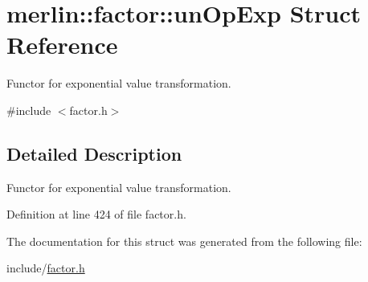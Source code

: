 \hypertarget{structmerlin_1_1factor_1_1unOpExp}{}\section{merlin\+:\+:factor\+:\+:un\+Op\+Exp Struct Reference}
\label{structmerlin_1_1factor_1_1unOpExp}


Functor for exponential value transformation.  




{\ttfamily \#include $<$factor.\+h$>$}



\subsection{Detailed Description}
Functor for exponential value transformation. 

Definition at line 424 of file factor.\+h.



The documentation for this struct was generated from the following file\+:\begin{DoxyCompactItemize}
\item 
include/\hyperlink{factor_8h}{factor.\+h}\end{DoxyCompactItemize}
